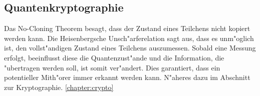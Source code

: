 \begin{refsection}
\subsection{Quantenkryptographie} 
Das No-Cloning Theorem besagt, dass der Zustand eines Teilchens nicht kopiert werden kann. Die Heisenbergsche Unsch"arferelation sagt aus, dass es unm"oglich ist, den vollst"andigen Zustand eines Teilchens auszumessen. Sobald eine Messung erfolgt, beeinflusst diese die Quantenzust"ande und die Information, die "ubertragen werden soll, ist somit ver"andert. Dies garantiert, dass ein potentieller Mith"orer immer erkannt werden kann. N"aheres dazu im Abschnitt zur Kryptographie. \ref{chapter:crypto}

\printbibliography[heading=subbibliography]
\end{refsection}
